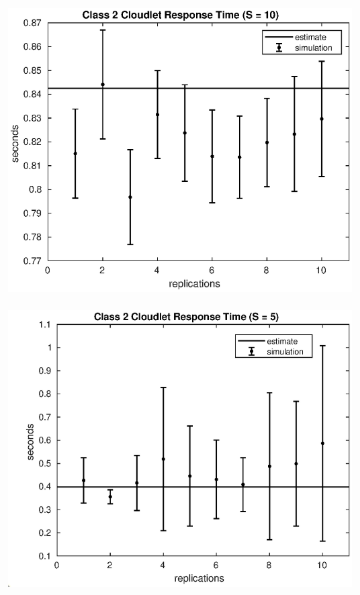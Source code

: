 \begin{frame}
\begin{figure}[!h]
\begin{subfigure}[t]{0.49\textwidth}
\label{15_s2clet}
\end{subfigure}
%
\begin{subfigure}[t]{0.49\textwidth}
\includegraphics[width=\textwidth]{../figures/simul/10_500K_s2clet}
\label{10_s2clet}
\end{subfigure}
%
\begin{subfigure}[t]{0.49\textwidth}
\includegraphics[width=\textwidth]{../figures/simul/5_500K_s2clet}
\label{5_s2clet}
\end{subfigure}
%
\label{plot:s2clet}
\end{figure}
\end{frame}
